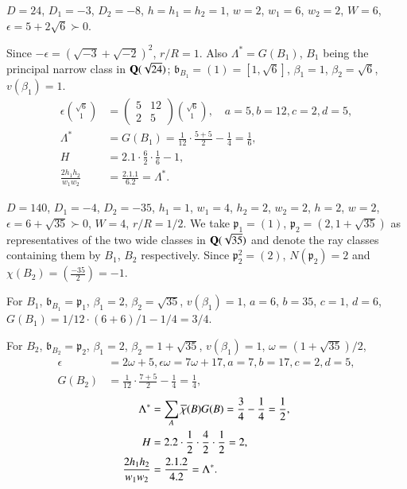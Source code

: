 \begin{exam}\label{exam2}
$D=24$, $D_{1}=-3$, $D_{2}=-8$, $h=h_{1}=h_{2}=1$, $w=2$, $w_{1}=6$,
  $w_{2}=2$, $W=6$, $\epsilon=5+2\sqrt{6} \succ 0$.
\end{exam}

Since $-\epsilon=(\sqrt{-3}+\sqrt{-2})^{2}$, $r/R=1$. Also
$\Lambda^{\ast}=G(B_{1})$, $B_{1}$ being the principal narrow class in
$\mathbf{Q}(\sqrt{24})$; $\mathfrak{b}_{B_{1}}=(1)=[1,\sqrt{6}]$,
$\beta_{1}=1$, $\beta_{2}=\sqrt{6}$, $v(\beta_{1})=1$.
\begin{align*}
\epsilon\binom{\sqrt{6}}{1} &= 
\begin{pmatrix}
5 & 12\\
2 & 5
\end{pmatrix}
\binom{\sqrt{6}}{1},\quad a=5, b=12, c=2, d=5,\\
\Lambda^{\ast} &= G(B_{1})=\frac{1}{12}\cdot
\frac{5+5}{2}-\frac{1}{4}=\frac{1}{6},\\ 
H &= 2.1\cdot \frac{6}{2}\cdot \frac{1}{6}-1,\\
\frac{2h_{1}h_{2}}{w_{1}w_{2}} &= \frac{2.1.1}{6.2}=\Lambda^{\ast}. 
\end{align*}

\begin{exam}\label{exam3}
$D=140$, $D_{1}=-4$, $D_{2}=-35$, $h_{1}=1$, $w_{1}=4$,
  $h_{2}=2$,\pageoriginale 
  $w_{2}=2$, $h=2$, $w=2$, $\epsilon=6+\sqrt{35} \succ 0$, $W=4$,
  $r/R=1/2$. We take $\mathfrak{p}_{1}=(1)$,
  $\mathfrak{p}_{2}=(2,1+\sqrt{35})$ as representatives of the two
  wide classes in $\mathbf{Q}(\sqrt{35})$ and denote the ray classes
  containing them by $B_{1}$, $B_{2}$ respectively. Since
  $\mathfrak{p}^{2}_{2}=(2)$, $N(\mathfrak{p}_{2})=2$ and
  $\chi(B_{2})=\left(\frac{-35}{2}\right)=-1$. 
\end{exam}

For $B_{1}$, $\mathfrak{b}_{B_{1}}=\mathfrak{p}_{1}$, $\beta_{1}=2$,
$\beta_{2}=\sqrt{35}$, $v(\beta_{1})=1$, $a=6$, $b=35$, $c=1$, $d=6$,
$G(B_{1})=1/12\cdot (6+6)/1-1/4=3/4$.

For $B_{2}$, $\mathfrak{b}_{B_{2}}=\mathfrak{p}_{2}$, $\beta_{1}=2$,
$\beta_{2}=1+\sqrt{35}$, $v(\beta_{1})=1$, $\omega=(1+\sqrt{35})/2$,
\begin{align*}
\epsilon &= 2\omega+5, \epsilon\omega=7\omega+17, a=7, b=17, c=2, d=5,\\
G(B_{2}) &= \frac{1}{12}\cdot \frac{7+5}{2}-\frac{1}{4}=\frac{1}{4},
\end{align*}
\begin{align*}
\Lambda^{\ast} &=
\sum_{A}\overline{\chi}(B)G(B)=\frac{3}{4}-\frac{1}{4}=\frac{1}{2},\\
H &= 2.2\cdot \frac{1}{2}\cdot \frac{4}{2}\cdot \frac{1}{2}=2,\\
\frac{2h_{1}h_{2}}{w_{1}w_{2}} &= \frac{2.1.2}{4.2}=\Lambda^{\ast}. 
\end{align*}

